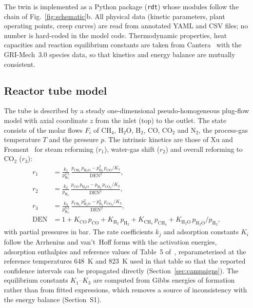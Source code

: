 \documentclass[final,3p,times]{elsarticle}
\newcommand{\ce}[1]{\mathrm{#1}}
\begin{document}
The twin is implemented as a Python package (\texttt{rdt}) whose modules follow the chain of Fig.~\ref{fig:schematic}b. All physical data (kinetic parameters, plant operating points, creep curves) are read from annotated YAML and CSV files; no number is hard-coded in the model code. Thermodynamic properties, heat capacities and reaction equilibrium constants are taken from Cantera~\cite{cantera} with the GRI-Mech~3.0 species data, so that kinetics and energy balance are mutually consistent.

\subsection{Reactor tube model}
\label{sec:tube}

The tube is described by a steady one-dimensional pseudo-homogeneous plug-flow model with axial coordinate $z$ from the inlet (top) to the outlet. The state consists of the molar flows $F_i$ of CH$_4$, H$_2$O, H$_2$, CO, CO$_2$ and N$_2$, the process-gas temperature $T$ and the pressure $p$. The intrinsic kinetics are those of Xu and Froment~\cite{xu1989a} for steam reforming ($r_1$), water-gas shift ($r_2$) and overall reforming to CO$_2$ ($r_3$):
\begin{align}
r_1 &= \frac{k_1}{p_{\ce{H_2}}^{2.5}}\,\frac{p_{\ce{CH_4}}\,p_{\ce{H_2O}} - p_{\ce{H_2}}^{3}\,p_{\ce{CO}}/K_1}{\mathrm{DEN}^2}, \label{eq:r1}\\
r_2 &= \frac{k_2}{p_{\ce{H_2}}}\,\frac{p_{\ce{CO}}\,p_{\ce{H_2O}} - p_{\ce{H_2}}\,p_{\ce{CO_2}}/K_2}{\mathrm{DEN}^2}, \label{eq:r2}\\
r_3 &= \frac{k_3}{p_{\ce{H_2}}^{3.5}}\,\frac{p_{\ce{CH_4}}\,p_{\ce{H_2O}}^{2} - p_{\ce{H_2}}^{4}\,p_{\ce{CO_2}}/K_3}{\mathrm{DEN}^2}, \label{eq:r3}\\
\mathrm{DEN} &= 1 + K_{\ce{CO}}\,p_{\ce{CO}} + K_{\ce{H_2}}\,p_{\ce{H_2}} + K_{\ce{CH_4}}\,p_{\ce{CH_4}} + K_{\ce{H_2O}}\,p_{\ce{H_2O}}/p_{\ce{H_2}}, \label{eq:den}
\end{align}
with partial pressures in bar. The rate coefficients $k_j$ and adsorption constants $K_i$ follow the Arrhenius and van't~Hoff forms with the activation energies, adsorption enthalpies and reference values of Table~5 of~\cite{xu1989a}, reparameterised at the reference temperatures 648~K and 823~K used in that table so that the reported confidence intervals can be propagated directly (Section~\ref{sec:campaigns}). The equilibrium constants $K_1$--$K_3$ are computed from Gibbs energies of formation rather than from fitted expressions, which removes a source of inconsistency with the energy balance (Section~S1).
\end{document}
